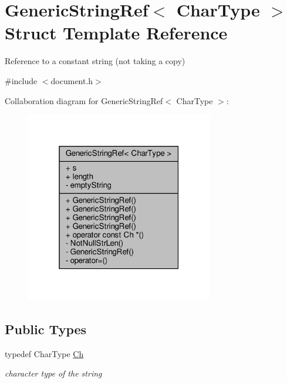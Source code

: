 \hypertarget{structGenericStringRef}{}\section{Generic\+String\+Ref$<$ Char\+Type $>$ Struct Template Reference}
\label{structGenericStringRef}


Reference to a constant string (not taking a copy)  




{\ttfamily \#include $<$document.\+h$>$}



Collaboration diagram for Generic\+String\+Ref$<$ Char\+Type $>$\+:
\nopagebreak
\begin{figure}[H]
\begin{center}
\leavevmode
\includegraphics[width=232pt]{structGenericStringRef__coll__graph}
\end{center}
\end{figure}
\subsection*{Public Types}
\begin{DoxyCompactItemize}
\item 
typedef Char\+Type \hyperlink{structGenericStringRef_a16908c3fce41be380061330c14ba2140}{Ch}
\begin{DoxyCompactList}\small\item\em character type of the string \end{DoxyCompactList}\end{DoxyCompactItemize}
